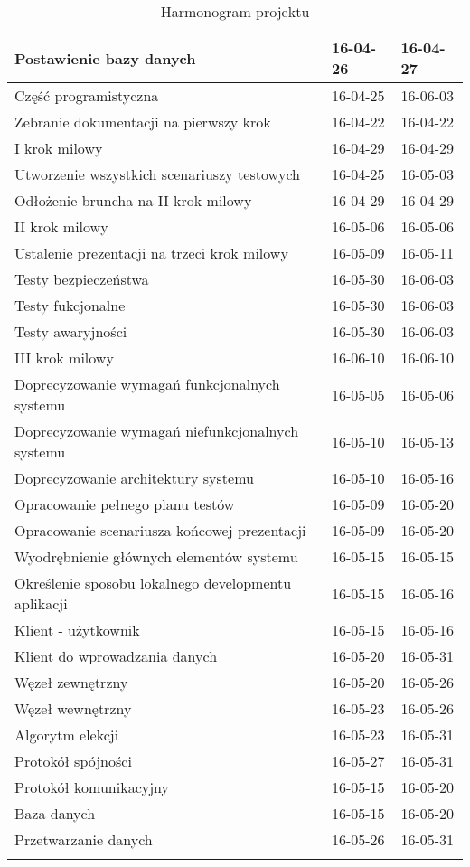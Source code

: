 \begin{longtable}{| p{} || p{} | p{} |}
Postawienie bazy danych & 16-04-26 & 16-04-27 \\ \hline
Część programistyczna & 16-04-25 & 16-06-03 \\ \hline
Zebranie dokumentacji na pierwszy krok & 16-04-22 & 16-04-22 \\ \hline
I krok milowy & 16-04-29 & 16-04-29 \\ \hline
Utworzenie wszystkich scenariuszy testowych & 16-04-25 & 16-05-03 \\ \hline
Odłożenie bruncha na II krok milowy & 16-04-29 & 16-04-29 \\ \hline
II krok milowy & 16-05-06 & 16-05-06 \\ \hline
Ustalenie prezentacji na trzeci krok milowy & 16-05-09 & 16-05-11 \\ \hline
Testy bezpieczeństwa & 16-05-30 & 16-06-03 \\ \hline
Testy fukcjonalne & 16-05-30 & 16-06-03 \\ \hline
Testy awaryjności & 16-05-30 & 16-06-03 \\ \hline
III krok milowy & 16-06-10 & 16-06-10 \\ \hline
Doprecyzowanie wymagań funkcjonalnych systemu & 16-05-05 & 16-05-06 \\ \hline
Doprecyzowanie wymagań niefunkcjonalnych systemu & 16-05-10 & 16-05-13 \\ \hline
Doprecyzowanie architektury systemu & 16-05-10 & 16-05-16 \\ \hline
Opracowanie pełnego planu testów & 16-05-09 & 16-05-20 \\ \hline
Opracowanie scenariusza końcowej prezentacji & 16-05-09 & 16-05-20 \\ \hline
Wyodrębnienie głównych elementów systemu & 16-05-15 & 16-05-15 \\ \hline
Określenie sposobu lokalnego developmentu aplikacji & 16-05-15 & 16-05-16 \\ \hline
Klient - użytkownik & 16-05-15 & 16-05-16 \\ \hline
Klient do wprowadzania danych & 16-05-20 & 16-05-31 \\ \hline
Węzeł zewnętrzny & 16-05-20 & 16-05-26 \\ \hline
Węzeł wewnętrzny & 16-05-23 & 16-05-26 \\ \hline
Algorytm elekcji & 16-05-23 & 16-05-31 \\ \hline
Protokół spójności & 16-05-27 & 16-05-31 \\ \hline
Protokół komunikacyjny & 16-05-15 & 16-05-20 \\ \hline
Baza danych & 16-05-15 & 16-05-20 \\ \hline
Przetwarzanie danych & 16-05-26 & 16-05-31 \\ \hline

\caption{Harmonogram projektu}
\label{tab:harmonogram}
\end{longtable} 



